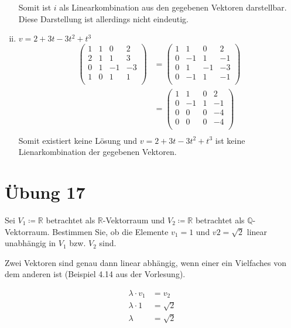 \documentclass{article}
\begin{document}
\begin{enumerate}[(i)]
  Somit ist $i$ als Linearkombination aus den gegebenen Vektoren darstellbar. Diese Darstellung ist allerdings nicht eindeutig.
       
\item $v = 2 + 3t - 3t^2 + t^3$
  \begin{align*}
    \left(
    \begin{array}{ccc|c}
      1 & 1 & 0  & 2  \\
      2 & 1 & 1  & 3  \\
      0 & 1 & -1 & -3 \\
      1 & 0 & 1  & 1  \\
    \end{array}
    \right)
    &=
    \left(
    \begin{array}{ccc|c}
      1 & 1  & 0  & 2  \\
      0 & -1 & 1  & -1  \\
      0 & 1  & -1 & -3 \\
      0 & -1 & 1  & -1  \\
    \end{array}
    \right) \\
    &=
    \left(
    \begin{array}{ccc|c}
      1 & 1  & 0 & 2  \\
      0 & -1 & 1 & -1 \\
      0 & 0  & 0 & -4 \\
      0 & 0  & 0 & -4 \\
    \end{array}
    \right) \\
  \end{align*}
  Somit existiert keine Lösung und  $v = 2 + 3t - 3t^2 + t^3$ ist keine Lienarkombination der gegebenen Vektoren.
\end{enumerate}

\section*{Übung 17}

Sei $V_1 \coloneqq \mathbb{R}$ betrachtet als $\mathbb{R}$-Vektorraum und 
$V_2 \coloneqq \mathbb{R}$ betrachtet als $\mathbb{Q}$-Vektorraum.
Bestimmen Sie, ob die Elemente $v_1 = 1$ und $v2 = \sqrt{2}$ linear unabhängig in
$V_1$ bzw. $V_2$ sind.


Zwei Vektoren sind genau dann linear abhängig, wenn einer ein Vielfaches von dem anderen ist (Beispiel 4.14 aus der Vorlesung).

\begin{align*}
  \lambda \cdot v_1 &= v_2 \\
  \lambda \cdot 1 &= \sqrt{2} \\
  \lambda &= \sqrt{2} \\
\end{align*}
\end{document}

